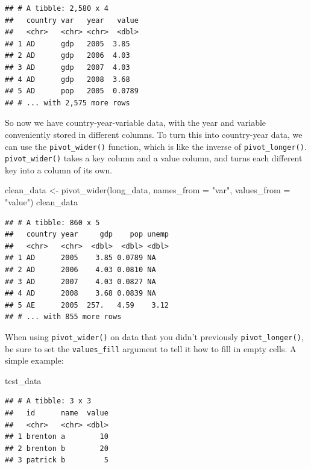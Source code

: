\documentclass[
  12pt,
  oneside,openany]{book}
\newenvironment{Shaded}{\begin{snugshade}}{\end{snugshade}}
\newcommand{\AttributeTok}[1]{\textcolor[rgb]{0.77,0.63,0.00}{#1}}
\newcommand{\FunctionTok}[1]{\textcolor[rgb]{0.00,0.00,0.00}{#1}}
\newcommand{\NormalTok}[1]{#1}
\newcommand{\OtherTok}[1]{\textcolor[rgb]{0.56,0.35,0.01}{#1}}
\newcommand{\StringTok}[1]{\textcolor[rgb]{0.31,0.60,0.02}{#1}}
\begin{document}
\begin{verbatim}
## # A tibble: 2,580 x 4
##   country var   year   value
##   <chr>   <chr> <chr>  <dbl>
## 1 AD      gdp   2005  3.85  
## 2 AD      gdp   2006  4.03  
## 3 AD      gdp   2007  4.03  
## 4 AD      gdp   2008  3.68  
## 5 AD      pop   2005  0.0789
## # ... with 2,575 more rows
\end{verbatim}

So now we have country-year-variable data, with the year and variable conveniently stored in different columns. To turn this into country-year data, we can use the \texttt{pivot\_wider()} function, which is like the inverse of \texttt{pivot\_longer()}. \texttt{pivot\_wider()} takes a key column and a value column, and turns each different key into a column of its own.

\begin{Shaded}
\begin{Highlighting}[]
\NormalTok{clean\_data }\OtherTok{\textless{}{-}} \FunctionTok{pivot\_wider}\NormalTok{(long\_data,}
                          \AttributeTok{names\_from =} \StringTok{"var"}\NormalTok{,}
                          \AttributeTok{values\_from =} \StringTok{"value"}\NormalTok{)}
\NormalTok{clean\_data}
\end{Highlighting}
\end{Shaded}

\begin{verbatim}
## # A tibble: 860 x 5
##   country year     gdp    pop unemp
##   <chr>   <chr>  <dbl>  <dbl> <dbl>
## 1 AD      2005    3.85 0.0789 NA   
## 2 AD      2006    4.03 0.0810 NA   
## 3 AD      2007    4.03 0.0827 NA   
## 4 AD      2008    3.68 0.0839 NA   
## 5 AE      2005  257.   4.59    3.12
## # ... with 855 more rows
\end{verbatim}

When using \texttt{pivot\_wider()} on data that you didn't previously \texttt{pivot\_longer()}, be sure to set the \texttt{values\_fill} argument to tell it how to fill in empty cells. A simple example:

\begin{Shaded}
\begin{Highlighting}[]
\NormalTok{test\_data}
\end{Highlighting}
\end{Shaded}

\begin{verbatim}
## # A tibble: 3 x 3
##   id      name  value
##   <chr>   <chr> <dbl>
## 1 brenton a        10
## 2 brenton b        20
## 3 patrick b         5
\end{verbatim}
\end{document}
